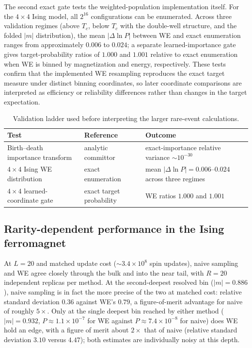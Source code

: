 \documentclass[a4paper,fleqn]{cas-sc}
\begin{document}
The second exact gate tests the weighted-population implementation itself.\label{sec:gate}
For the $4\times4$ Ising model, all $2^{16}$ configurations can be enumerated. Across three
validation regimes (above $T_c$, below $T_c$ with the double-well structure, and the folded
$|m|$ distribution), the mean $|\Delta\ln P|$ between WE and exact enumeration ranges from
approximately $0.006$ to $0.024$; a separate learned-importance gate gives target-probability
ratios of $1.000$ and $1.001$ relative to exact enumeration when WE is binned by magnetization
and energy, respectively. These tests confirm that the implemented WE resampling reproduces the exact target measure
under distinct binning coordinates, so later coordinate comparisons are interpreted as
efficiency or reliability differences rather than changes in the target expectation.

\begin{table}[H]
\centering\small
\caption{Validation ladder used before interpreting the larger rare-event calculations.}
\label{tab:ladder}
\begin{tabular}{p{}p{}p{}}
\toprule
Test & Reference & Outcome \\
\midrule
Birth--death importance transform & analytic committor & exact-importance relative variance
$\sim10^{-30}$ \\
$4\times4$ Ising WE distribution & exact enumeration & mean $|\Delta\ln P|=0.006$--$0.024$
across three regimes \\
$4\times4$ learned-coordinate gate & exact target probability & WE ratios $1.000$ and
$1.001$ \\
\bottomrule
\end{tabular}
\end{table}

\FloatBarrier

\subsection{Rarity-dependent performance in the Ising ferromagnet}\label{sec:tail}\label{sec:tailreach}
At $L=20$ and matched update cost ($\sim3.4\times10^{8}$ spin updates), naive sampling and WE
agree closely through the bulk and into the near tail, with $R=20$ independent replicas per
method. At the second-deepest resolved bin ($|m|=0.886$), naive sampling is in fact the more
precise of the two at matched cost: relative standard deviation $0.36$ against WE's $0.79$, a
figure-of-merit advantage for naive of roughly $5\times$. Only at the single deepest bin
reached by either method ($|m|=0.932$, $P\approx1.1\times10^{-7}$ for WE against
$P\approx7.4\times10^{-8}$ for naive) does WE hold an edge, with a figure of merit about
$2\times$ that of naive (relative standard deviation $3.10$ versus $4.47$); both estimates are
individually noisy at this depth.
\end{document}
